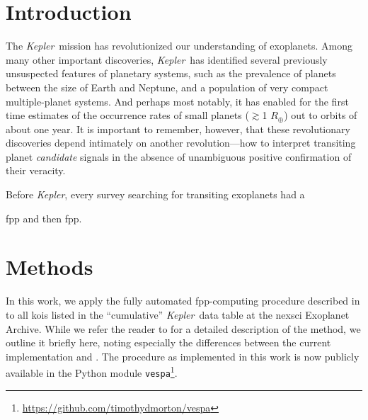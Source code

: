 \documentclass[preprint2]{aastex}
\newcommand{\kepler}{\textit{Kepler}}
\newcommand{\vespa}{\texttt{vespa}}
\begin{document}

\keywords{}


\section{Introduction}

The \kepler\ mission has revolutionized our understanding of
exoplanets.  Among many other important discoveries, \kepler\ has
identified several previously unsuspected features of planetary
systems, such as the prevalence of planets between the size of Earth
and Neptune, and a population of very compact multiple-planet
systems. And perhaps most notably, it has enabled for the first time
estimates of the occurrence rates of small planets ($\gtrsim$1
$R_\oplus$) out to orbits of about one year.  It is important to
remember, however, that these revolutionary discoveries depend
intimately on another revolution---how to interpret transiting planet
\textit{candidate} signals in the absence of unambiguous positive
confirmation of their veracity.

Before \kepler, every survey searching for transiting exoplanets had a 

\ac{fpp} and then \ac{fpp}.


\section{Methods}
\label{sec:methods}

In this work, we apply the fully automated \ac{fpp}-computing
procedure described in \citet{Morton:2012}
 to all \acp{koi} listed in the
``cumulative'' \kepler\ data table at the \ac{nexsci} Exoplanet
Archive.  While we refer the reader to  for a
detailed description of the method, we outline it briefly here, noting
especially the differences between the current implementation and
.  The procedure as implemented in this work
is now publicly available in the Python module
\vespa\footnote{\url{https://github.com/timothydmorton/vespa}}.
\end{document}
